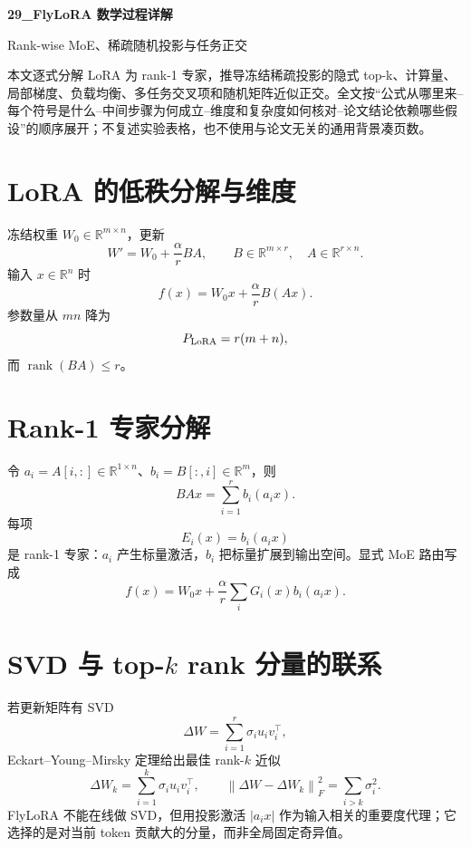 \documentclass[UTF8,12pt,a4paper,fontset=none]{ctexart}
\numberwithin{equation}{section}
\newcommand{\R}{\mathbb{R}}
\newcommand{\norm}[1]{\left\lVert #1\right\rVert}
\newcommand{\rank}{\operatorname{rank}}
\begin{document}
\begin{center}
{\LARGE\bfseries 29\_FlyLoRA 数学过程详解}\par
\vspace{0.35em}
{\large Rank-wise MoE、稀疏随机投影与任务正交}
\end{center}
\vspace{0.45em}
\begin{keybox}[本文只处理真正需要推导的部分]
本文逐式分解 LoRA 为 rank-1 专家，推导冻结稀疏投影的隐式 top-k、计算量、局部梯度、负载均衡、多任务交叉项和随机矩阵近似正交。全文按“公式从哪里来--每个符号是什么--中间步骤为何成立--维度和复杂度如何核对--论文结论依赖哪些假设”的顺序展开；不复述实验表格，也不使用与论文无关的通用背景凑页数。
\end{keybox}
\tableofcontents
\newpage

\section{LoRA 的低秩分解与维度}
冻结权重 $W_0\in\R^{m\times n}$，更新
\begin{equation}
 W'=W_0+\frac{\alpha}{r}BA,
 \qquad B\in\R^{m\times r},\quad A\in\R^{r\times n}.
\end{equation}
输入 $x\in\R^n$ 时
\begin{equation}
 f(x)=W_0x+\frac{\alpha}{r}B(Ax).
\end{equation}
参数量从 $mn$ 降为
\begin{equation}
 P_{\rm LoRA}=r(m+n),
\end{equation}
而 $\rank(BA)\le r$。

\section{Rank-1 专家分解}
令 $a_i=A[i,:]\in\R^{1\times n}$、$b_i=B[:,i]\in\R^{m}$，则
\begin{equation}
 BAx=\sum_{i=1}^{r}b_i(a_ix).
\end{equation}
每项
\begin{equation}
 E_i(x)=b_i(a_ix)
\end{equation}
是 rank-1 专家：$a_i$ 产生标量激活，$b_i$ 把标量扩展到输出空间。显式 MoE 路由写成
\begin{equation}
 f(x)=W_0x+\frac{\alpha}{r}\sum_iG_i(x)b_i(a_ix).
\end{equation}

\section{SVD 与 top-$k$ rank 分量的联系}
若更新矩阵有 SVD
\begin{equation}
 \Delta W=\sum_{i=1}^{r}\sigma_i u_iv_i^\top,
\end{equation}
Eckart--Young--Mirsky 定理给出最佳 rank-$k$ 近似
\begin{equation}
 \Delta W_k=\sum_{i=1}^{k}\sigma_i u_iv_i^\top,
 \qquad
 \norm{\Delta W-\Delta W_k}_F^2=\sum_{i>k}\sigma_i^2.
\end{equation}
FlyLoRA 不能在线做 SVD，但用投影激活 $|a_ix|$ 作为输入相关的重要度代理；它选择的是对当前 token 贡献大的分量，而非全局固定奇异值。
\end{document}

